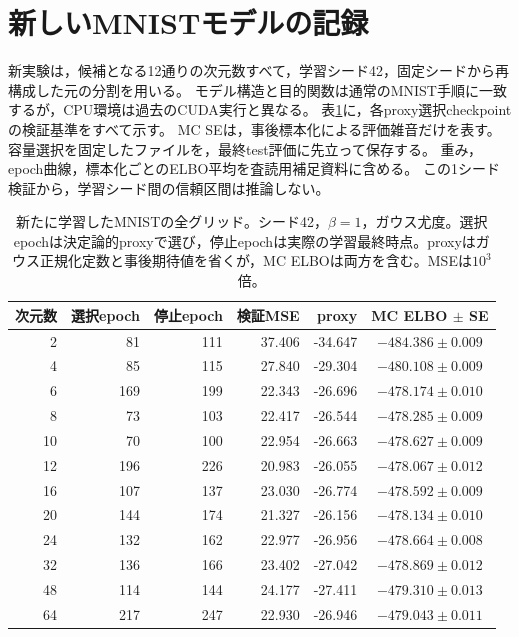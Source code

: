 \documentclass[11pt,a4paper]{ltjsarticle}
\begin{document}
\section{新しいMNISTモデルの記録}\label{app:newmodels}
新実験は，候補となる12通りの次元数すべて，学習シード42，固定シードから再構成した元の分割を用いる。
モデル構造と目的関数は通常のMNIST手順に一致するが，CPU環境は過去のCUDA実行と異なる。
表\ref{tab:mcgrid}に，各proxy選択checkpointの検証基準をすべて示す。
MC SEは，事後標本化による評価雑音だけを表す。
容量選択を固定したファイルを，最終test評価に先立って保存する。
重み，epoch曲線，標本化ごとのELBO平均を査読用補足資料に含める。
この1シード検証から，学習シード間の信頼区間は推論しない。
\begin{table}[H]
\caption{新たに学習したMNISTの全グリッド。シード42，$\beta=1$，ガウス尤度。選択epochは決定論的proxyで選び，停止epochは実際の学習最終時点。proxyはガウス正規化定数と事後期待値を省くが，MC ELBOは両方を含む。MSEは$10^3$倍。}\label{tab:mcgrid}
\small
\setlength{\tabcolsep}{3pt}
\begin{tabular*}{\textwidth}{@{\extracolsep{\fill}}rrrrrc@{}}
\toprule
次元数 & 選択epoch & 停止epoch & 検証MSE & proxy & MC ELBO $\pm$ SE \\
\midrule
2 & 81 & 111 & 37.406 & -34.647 & $-484.386 \pm 0.009$ \\
4 & 85 & 115 & 27.840 & -29.304 & $-480.108 \pm 0.009$ \\
6 & 169 & 199 & 22.343 & -26.696 & $-478.174 \pm 0.010$ \\
8 & 73 & 103 & 22.417 & -26.544 & $-478.285 \pm 0.009$ \\
10 & 70 & 100 & 22.954 & -26.663 & $-478.627 \pm 0.009$ \\
12 & 196 & 226 & 20.983 & -26.055 & $-478.067 \pm 0.012$ \\
16 & 107 & 137 & 23.030 & -26.774 & $-478.592 \pm 0.009$ \\
20 & 144 & 174 & 21.327 & -26.156 & $-478.134 \pm 0.010$ \\
24 & 132 & 162 & 22.977 & -26.956 & $-478.664 \pm 0.008$ \\
32 & 136 & 166 & 23.402 & -27.042 & $-478.869 \pm 0.012$ \\
48 & 114 & 144 & 24.177 & -27.411 & $-479.310 \pm 0.013$ \\
64 & 217 & 247 & 22.930 & -26.946 & $-479.043 \pm 0.011$ \\
\bottomrule\end{tabular*}
\end{table}
\end{document}
